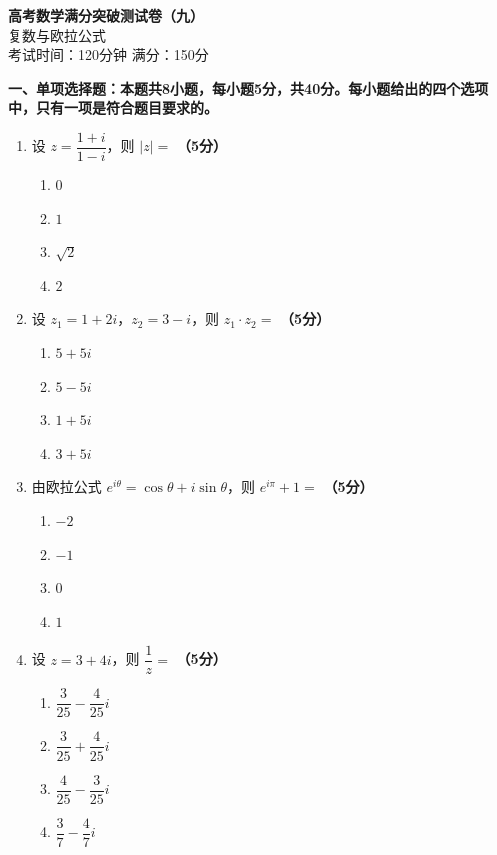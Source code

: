 \documentclass[12pt, a4paper]{ctexart}
\newcommand{\score}[1]{\hfill\textbf{（#1分）}}
\begin{document}
\begin{center}
{\LARGE\bfseries 高考数学满分突破测试卷（九）}\\[8pt]
{\large 复数与欧拉公式}\\[6pt]
考试时间：120分钟 \quad 满分：150分
\end{center}

\vspace{10pt}

{\large\bfseries 一、单项选择题：本题共8小题，每小题5分，共40分。每小题给出的四个选项中，只有一项是符合题目要求的。}

\vspace{8pt}

\begin{enumerate}

\item 设 $z=\dfrac{1+i}{1-i}$，则 $|z|=$ \score{5}
\begin{enumerate}[label=\Alph*.]
    \item $0$
    \item $1$
    \item $\sqrt{2}$
    \item $2$
\end{enumerate}

\item 设 $z_1=1+2i$，$z_2=3-i$，则 $z_1\cdot z_2=$ \score{5}
\begin{enumerate}[label=\Alph*.]
    \item $5+5i$
    \item $5-5i$
    \item $1+5i$
    \item $3+5i$
\end{enumerate}

\item 由欧拉公式 $e^{i\theta}=\cos\theta+i\sin\theta$，则 $e^{i\pi}+1=$ \score{5}
\begin{enumerate}[label=\Alph*.]
    \item $-2$
    \item $-1$
    \item $0$
    \item $1$
\end{enumerate}

\item 设 $z=3+4i$，则 $\dfrac{1}{z}=$ \score{5}
\begin{enumerate}[label=\Alph*.]
    \item $\dfrac{3}{25}-\dfrac{4}{25}i$
    \item $\dfrac{3}{25}+\dfrac{4}{25}i$
    \item $\dfrac{4}{25}-\dfrac{3}{25}i$
    \item $\dfrac{3}{7}-\dfrac{4}{7}i$
\end{enumerate}


\end{enumerate}
\end{document}
